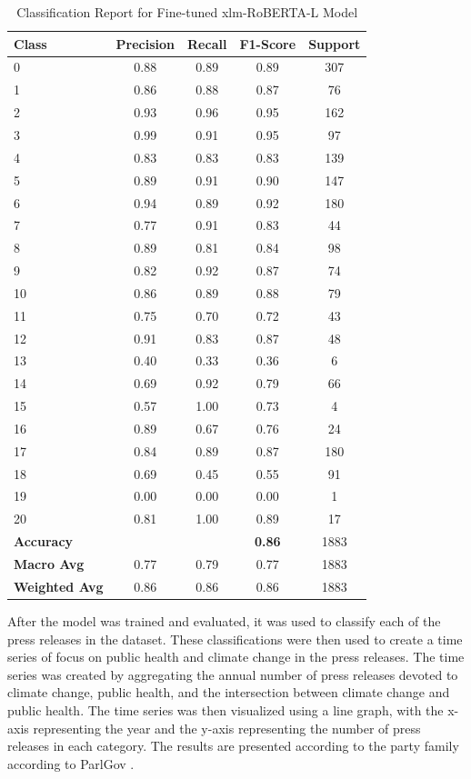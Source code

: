 \documentclass[
  letterpaper,
  DIV=11,
  numbers=noendperiod]{scrartcl}
\begin{document}
\begin{table}[ht]
\caption{Classification Report for Fine-tuned xlm-RoBERTA-L Model}
\centering
\begin{tabular}{lcccc}
\hline
\textbf{Class} & \textbf{Precision} & \textbf{Recall} & \textbf{F1-Score} & \textbf{Support} \\
\hline
0  & 0.88 & 0.89 & 0.89 & 307 \\
1  & 0.86 & 0.88 & 0.87 & 76 \\
2  & 0.93 & 0.96 & 0.95 & 162 \\
3  & 0.99 & 0.91 & 0.95 & 97 \\
4  & 0.83 & 0.83 & 0.83 & 139 \\
5  & 0.89 & 0.91 & 0.90 & 147 \\
6  & 0.94 & 0.89 & 0.92 & 180 \\
7  & 0.77 & 0.91 & 0.83 & 44 \\
8  & 0.89 & 0.81 & 0.84 & 98 \\
9  & 0.82 & 0.92 & 0.87 & 74 \\
10 & 0.86 & 0.89 & 0.88 & 79 \\
11 & 0.75 & 0.70 & 0.72 & 43 \\
12 & 0.91 & 0.83 & 0.87 & 48 \\
13 & 0.40 & 0.33 & 0.36 & 6 \\
14 & 0.69 & 0.92 & 0.79 & 66 \\
15 & 0.57 & 1.00 & 0.73 & 4 \\
16 & 0.89 & 0.67 & 0.76 & 24 \\
17 & 0.84 & 0.89 & 0.87 & 180 \\
18 & 0.69 & 0.45 & 0.55 & 91 \\
19 & 0.00 & 0.00 & 0.00 & 1 \\
20 & 0.81 & 1.00 & 0.89 & 17 \\
\hline
\textbf{Accuracy}     &       &       & \textbf{0.86} & 1883 \\
\textbf{Macro Avg}    & 0.77  & 0.79  & 0.77  & 1883 \\
\textbf{Weighted Avg} & 0.86  & 0.86  & 0.86  & 1883 \\
\hline
\end{tabular}

\end{table}

After the model was trained and evaluated, it was used to classify each
of the press releases in the dataset. These classifications were then
used to create a time series of focus on public health and climate
change in the press releases. The time series was created by aggregating
the annual number of press releases devoted to climate change, public
health, and the intersection between climate change and public health.
The time series was then visualized using a line graph, with the x-axis
representing the year and the y-axis representing the number of press
releases in each category. The results are presented according to the
party family according to ParlGov \citep{doring2012parliament}.
\end{document}
